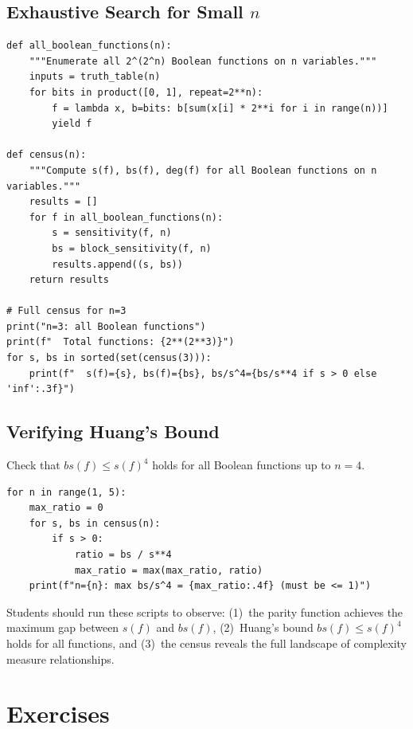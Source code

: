 \subsection{Exhaustive Search for Small $n$}

\begin{verbatim}
def all_boolean_functions(n):
    """Enumerate all 2^(2^n) Boolean functions on n variables."""
    inputs = truth_table(n)
    for bits in product([0, 1], repeat=2**n):
        f = lambda x, b=bits: b[sum(x[i] * 2**i for i in range(n))]
        yield f

def census(n):
    """Compute s(f), bs(f), deg(f) for all Boolean functions on n variables."""
    results = []
    for f in all_boolean_functions(n):
        s = sensitivity(f, n)
        bs = block_sensitivity(f, n)
        results.append((s, bs))
    return results

# Full census for n=3
print("n=3: all Boolean functions")
print(f"  Total functions: {2**(2**3)}")
for s, bs in sorted(set(census(3))):
    print(f"  s(f)={s}, bs(f)={bs}, bs/s^4={bs/s**4 if s > 0 else 'inf':.3f}")
\end{verbatim}

\subsection{Verifying Huang's Bound}

Check that $bs(f) \leq s(f)^4$ holds for all Boolean functions up to $n=4$.

\begin{verbatim}
for n in range(1, 5):
    max_ratio = 0
    for s, bs in census(n):
        if s > 0:
            ratio = bs / s**4
            max_ratio = max(max_ratio, ratio)
    print(f"n={n}: max bs/s^4 = {max_ratio:.4f} (must be <= 1)")
\end{verbatim}

\begin{highlightbox}
Students should run these scripts to observe: (1)~the parity function achieves the maximum gap between $s(f)$ and $bs(f)$, (2)~Huang's bound $bs(f) \leq s(f)^4$ holds for all functions, and (3)~the census reveals the full landscape of complexity measure relationships.
\end{highlightbox}

\section{Exercises}

